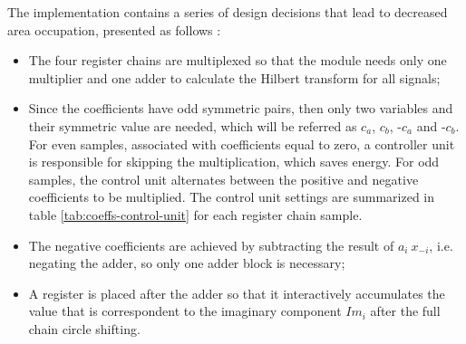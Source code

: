 The implementation contains a series of design decisions that lead to decreased area occupation, presented as follows :

\begin{itemize}
	\item The four register chains are multiplexed so that the module needs only one multiplier and one adder to calculate the Hilbert transform for all signals;
	
	\item Since the coefficients have odd symmetric pairs, then only two variables and their symmetric value are needed, which will be referred as $c_a$, $c_b$, -$c_a$ and -$c_b$. For even samples, associated with coefficients equal to zero, a controller unit is responsible for skipping the multiplication, which saves energy. For odd samples, the control unit alternates between the positive and negative coefficients to be multiplied. The control unit settings are summarized in table \ref{tab:coeffs-control-unit} for each register chain sample. 
	
	\begin{table}[!htbp] %
		\begin{center}
			\caption{Hilbert filter control unit settings for each processed sample}
			\label{tab:coeffs-control-unit}
		\end{center}
	\end{table}
	
	\item The negative coefficients are achieved by subtracting the result of $a_{i} \ x_{-i}$, i.e. negating the adder, so only one adder block is necessary;
	
	\item A register is placed after the adder so that it interactively accumulates the value that is correspondent to the imaginary component $Im_i$ after the full chain circle shifting.

\end{itemize}

